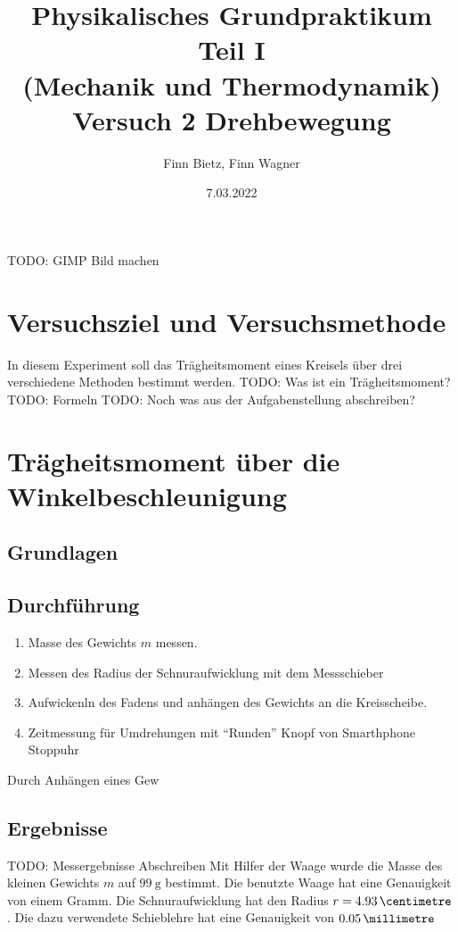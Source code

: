 \documentclass{article}
\date{7.03.2022}
\title{Physikalisches Grundpraktikum Teil I \\ (Mechanik und Thermodynamik) \\ Versuch 2 Drehbewegung}
\author{Finn Bietz, Finn Wagner}
\begin{document}
	
	\maketitle

	TODO: GIMP Bild machen

	\section{Versuchsziel und Versuchsmethode}
			In diesem Experiment soll das Trägheitsmoment eines Kreisels über drei verschiedene Methoden bestimmt werden.
			TODO: Was ist ein Trägheitsmoment?
			TODO: Formeln
			TODO: Noch was aus der Aufgabenstellung abschreiben?

	\section{Trägheitsmoment über die Winkelbeschleunigung}

		\subsection{Grundlagen}

		\subsection{Durchführung}
		\begin{enumerate}
			\item Masse des Gewichts \(m\) messen.
			\item Messen des Radius der Schnuraufwicklung mit dem Messschieber

			\item Aufwickenln des Fadens und anhängen des Gewichts an die Kreisscheibe.
			\item Zeitmessung für Umdrehungen mit \enquote{Runden} Knopf von Smarthphone Stoppuhr

		\end{enumerate}

		Durch Anhängen eines Gew

		\subsection{Ergebnisse}
		TODO: Messergebnisse Abschreiben
		Mit Hilfer der Waage wurde die Masse des kleinen Gewichts \(m\) auf \(\SI{99}{\gram}\) bestimmt.
		Die benutzte Waage hat eine Genauigkeit von einem Gramm.
		Die Schnuraufwicklung hat den Radius \(r = \SI{4.93}{\centimetre}\). Die dazu verwendete Schieblehre
		hat eine Genauigkeit von \(\SI{0.05}{\millimetre}\) 
\end{document}
